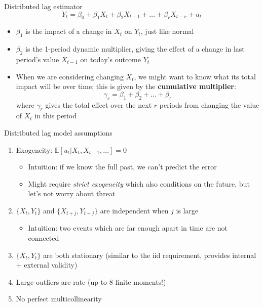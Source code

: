 \documentclass[aspectratio=169]{beamer}
\begin{document}
\begin{frame}{Distributed lag estimator}
    $$
    Y_t=\beta_0+\beta_1 X_t+\beta_2 X_{t-1}+\ldots+\beta_r X_{t-r}+u_t
    $$
    \begin{itemize}
        \item $\beta_1$ is the impact of a change in $X_t$ on $Y_t$, just like normal
        \item $\beta_2$ is the 1-period dynamic multiplier, giving the effect of a change in last period's value $X_{t-1}$ on today's outcome $Y_t$
        \item When we are considering changing $X_t$, we might want to know what its total impact will be over time; this is given by the \textbf{cumulative multiplier}:
        $$
            \gamma_r = \beta_1 + \beta_2 + \dots + \beta_r
        $$
        where $\gamma_r$ gives the total effect over the next $r$ periods from changing the value of $X_t$ in this period
    \end{itemize}
\end{frame}

\begin{frame}{Distributed lag model assumptions}
    \begin{enumerate}
        \item Exogeneity: $\mathbb{E} \left[ u_t | X_t, X_{t-1}, \dots \right]  = 0$
        \begin{itemize}
            \item Intuition: if we know the full past, we can't predict the error
            \item Might require \textit{strict exogeneity} which also conditions on the future, but let's not worry about threat
        \end{itemize}
        \item $\{X_t,Y_t\}$ and $\{X_{t+j},Y_{t+j}\}$ are independent when $j$ is large
        \begin{itemize}
            \item Intuition: two events which are far enough apart in time are not connected
        \end{itemize}
        \item $\{X_t,Y_t\}$ are both stationary (similar to the iid requirement, provides internal + external validity)
        \item Large outliers are rate (up to 8 finite moments!)
        \item No perfect multicollinearity
    \end{enumerate}
\end{frame}
\end{document}
